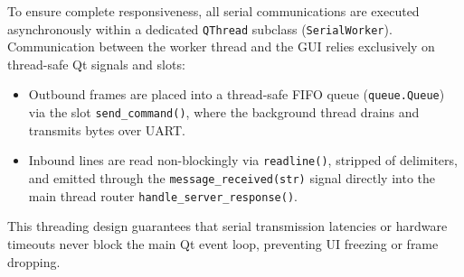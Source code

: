 To ensure complete responsiveness, all serial communications are executed asynchronously within a dedicated \texttt{QThread} subclass (\texttt{SerialWorker}). Communication between the worker thread and the GUI relies exclusively on thread-safe Qt signals and slots:
\begin{itemize}
    \item Outbound frames are placed into a thread-safe FIFO queue (\texttt{queue.Queue}) via the slot \texttt{send\_command()}, where the background thread drains and transmits bytes over UART.
    \item Inbound lines are read non-blockingly via \texttt{readline()}, stripped of delimiters, and emitted through the \texttt{message\_received(str)} signal directly into the main thread router \texttt{handle\_server\_response()}.
\end{itemize}
This threading design guarantees that serial transmission latencies or hardware timeouts never block the main Qt event loop, preventing UI freezing or frame dropping.

